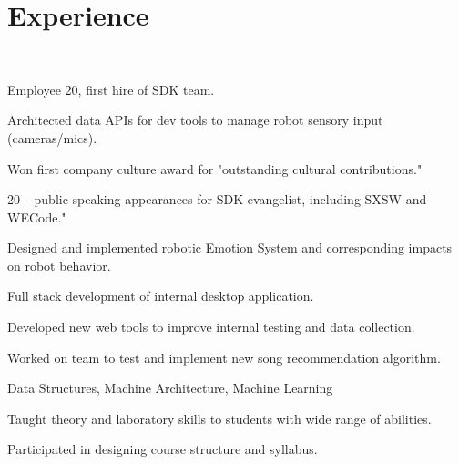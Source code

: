 \documentclass[]{csaund-resume}
\begin{document}
\hfill
\begin{minipage}[t]{0.66\textwidth}


\section{Experience}
 \\
\vspace{\topsep} %
\begin{tightemize}
\item Employee 20, first hire of SDK team.
\item Architected data APIs for dev tools to manage robot sensory input (cameras/mics).
\item Won first company culture award for "outstanding cultural contributions."
\item 20+ public speaking appearances for SDK evangelist, including SXSW and WECode."
\end{tightemize}
\begin{tightemize}
\item Designed and implemented robotic Emotion System and corresponding impacts on robot behavior.
\end{tightemize}
\sectionsep

\begin{tightemize}
\item Full stack development of internal desktop application.
\item Developed new web tools to improve internal testing and data collection.
\item Worked on team to test and implement new song recommendation algorithm.
\end{tightemize}
\sectionsep

\begin{tightemize}
\item Data Structures, Machine Architecture, Machine Learning
\item Taught theory and laboratory skills to students with wide range of abilities.
\item Participated in designing course structure and syllabus.
\end{tightemize}
\sectionsep


\end{minipage}
\end{document}
